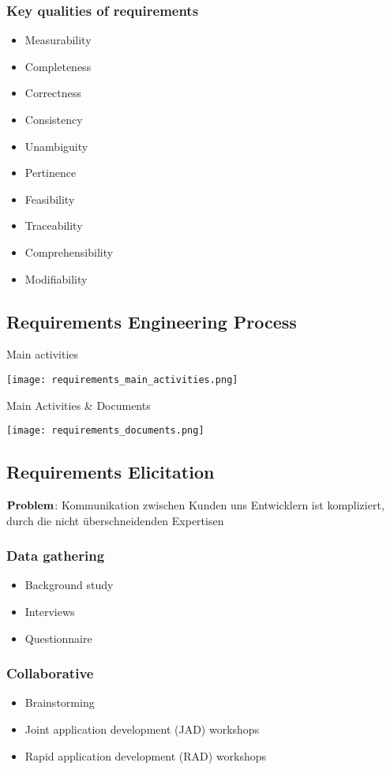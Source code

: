 \subsubsection{Key qualities of requirements}
\begin{itemize}
	\item Measurability 
	\item Completeness
	\item Correctness
	\item Consistency 
	\item Unambiguity
	\item Pertinence
	\item Feasibility
	\item Traceability
	\item Comprehensibility
	\item Modifiability 
\end{itemize}
\subsection{Requirements Engineering Process}
\begin{table}[H]
\caption{Main activities}
\texttt{[image: requirements\_main\_activities.png]}
\end{table}
\begin{table}[H]
\caption{Main Activities \& Documents}
\texttt{[image: requirements\_documents.png]}
\end{table}
\subsection{Requirements Elicitation}
$\bold{Problem}$: Kommunikation zwischen Kunden uns Entwicklern ist kompliziert, durch die nicht überschneidenden Expertisen
\subsubsection{Data gathering}
\begin{itemize}
	\item Background study
	\item Interviews
	\item Questionnaire
\end{itemize}
\subsubsection{Collaborative}
\begin{itemize}
	\item Brainstorming
	\item Joint application development (JAD) workshops
	\item Rapid application development (RAD) workshops
\end{itemize}
